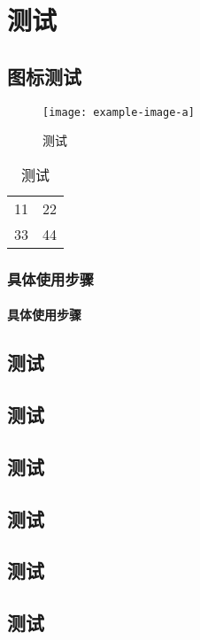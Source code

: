 \documentclass[library = {math.master}]{whuthesis}
\begin{document}
\mainmatter

\chapter{测试}
\section{图标测试}

\begin{figure}[htbp]
  \centering
  \texttt{[image: example-image-a]}
  \caption{测试}
  \label{figure:test}
\end{figure}

\begin{table}[htbp]
  \centering
  \caption{测试}
  \label{table:test}
  \begin{tabular}{|c|c|}
    11 & 22 \\
    33 & 44 
  \end{tabular}
\end{table}


\subsection{具体使用步骤}
\subsubsection{具体使用步骤}
\section{测试}
\section{测试}
\section{测试}
\section{测试}
\section{测试}
\section{测试}
\end{document}
